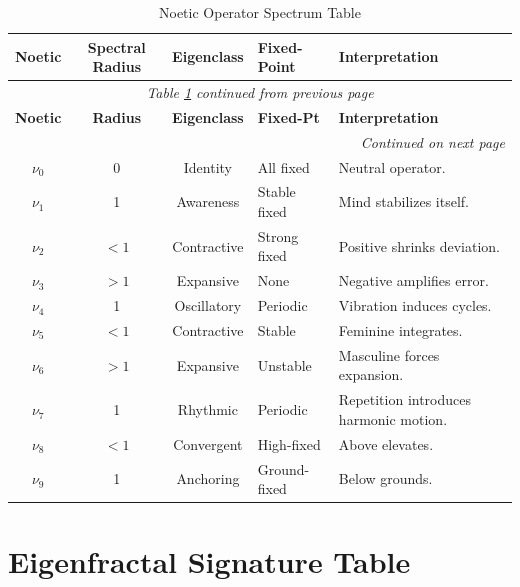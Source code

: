 \renewcommand{\arraystretch}{1.25}
\small
\begin{longtable}{c|c|c|p{2cm}|p{5cm}}
\caption{Noetic Operator Spectrum Table}
\label{tab:noetic-spectrum} \\
\toprule
\textbf{Noetic}
& \textbf{Spectral Radius}
& \textbf{Eigenclass}
& \textbf{Fixed-Point}
& \textbf{Interpretation}
\\
\midrule
\endfirsthead
\multicolumn{5}{c}{\textit{Table \ref{tab:noetic-spectrum} continued from previous page}} \\
\toprule
\textbf{Noetic}
& \textbf{Radius}
& \textbf{Eigenclass}
& \textbf{Fixed-Pt}
& \textbf{Interpretation}
\\
\midrule
\endhead
\midrule
\multicolumn{5}{r}{\textit{Continued on next page}} \\
\endfoot
\bottomrule
\endlastfoot

$\nu_0$ & 0 & Identity & All fixed & Neutral operator. \\

$\nu_1$ & 1 & Awareness & Stable fixed & Mind stabilizes itself. \\

$\nu_2$ & $<1$ & Contractive & Strong fixed & Positive shrinks deviation. \\

$\nu_3$ & $>1$ & Expansive & None & Negative amplifies error. \\

$\nu_4$ & 1 & Oscillatory & Periodic & Vibration induces cycles. \\

$\nu_5$ & $<1$ & Contractive & Stable & Feminine integrates. \\

$\nu_6$ & $>1$ & Expansive & Unstable & Masculine forces expansion. \\

$\nu_7$ & 1 & Rhythmic & Periodic & Repetition introduces harmonic motion. \\

$\nu_8$ & $<1$ & Convergent & High-fixed & Above elevates. \\

$\nu_9$ & 1 & Anchoring & Ground-fixed & Below grounds. \\

\end{longtable}
\normalsize

\section{Eigenfractal Signature Table}

